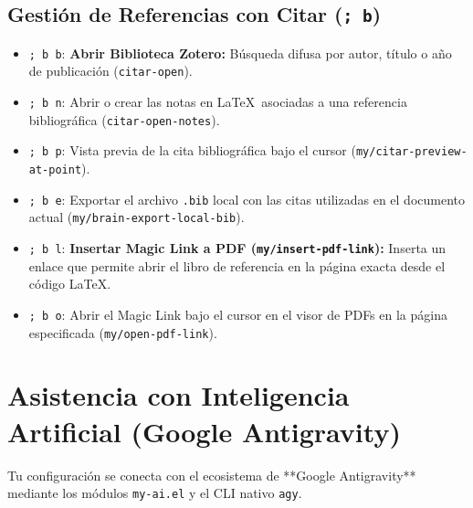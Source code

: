 \documentclass[11pt,book,spanish,alphabetic]{apuntes-scr}
\begin{document}
\section{Gestión de Referencias con Citar (\texttt{; b})}
\begin{itemize}[leftmargin=8mm]
    \item \texttt{; b b}: \textbf{Abrir Biblioteca Zotero:} Búsqueda difusa por autor, título o año de publicación (\texttt{citar-open}).
    \item \texttt{; b n}: Abrir o crear las notas en \LaTeX\ asociadas a una referencia bibliográfica (\texttt{citar-open-notes}).
    \item \texttt{; b p}: Vista previa de la cita bibliográfica bajo el cursor (\texttt{my/citar-preview-at-point}).
    \item \texttt{; b e}: Exportar el archivo \texttt{.bib} local con las citas utilizadas en el documento actual (\texttt{my/brain-export-local-bib}).
    \item \texttt{; b l}: \textbf{Insertar Magic Link a PDF (\texttt{my/insert-pdf-link}):} Inserta un enlace que permite abrir el libro de referencia en la página exacta desde el código \LaTeX.
    \item \texttt{; b o}: Abrir el Magic Link bajo el cursor en el visor de PDFs en la página especificada (\texttt{my/open-pdf-link}).
\end{itemize}

\chapter{Asistencia con Inteligencia Artificial (Google Antigravity)}

Tu configuración se conecta con el ecosistema de **Google Antigravity** mediante los módulos \texttt{my-ai.el} y el CLI nativo \texttt{agy}.
\end{document}
